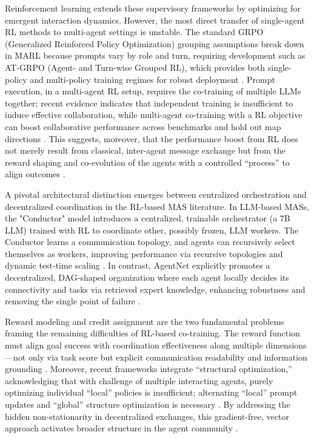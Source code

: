 \documentclass[11pt,a4paper]{article}
\begin{document}
Reinforcement learning extends these supervisory frameworks by optimizing for emergent interaction dynamics. However, the most direct transfer of single-agent RL methods to multi-agent settings is unstable. The standard GRPO (Generalized Reinforced Policy Optimization) grouping assumptions break down in MARL because prompts vary by role and turn, requiring development such as AT-GRPO (Agent- and Turn-wise Grouped RL), which  provides both single-policy and multi-policy training regimes for robust deployment \cite{arxiv:2510.11062v5}. Prompt execution, in a multi-agent RL setup, requires the co-training of multiple LLMs together; recent evidence indicates that independent training is insufficient to induce effective collaboration, while multi-agent co-training with a RL objective can boost collaborative performance across benchmarks and hold out map directions \cite{arxiv:2502.18439v2}. This suggests, moreover, that the performance boost from RL does not merely result from classical, inter-agent message exchange but from the reward shaping and co-evolution of the agents with a controlled ``process'' to align outcomes \cite{arxiv:2501.06322v1}.

A pivotal architectural distinction emerges between centralized orchestration and decentralized coordination in the RL-based MAS literature. In LLM-based MASs, the "Conductor" model introduces a centralized, trainable orchestrator (a 7B LLM) trained with RL to coordinate other, possibly frozen, LLM workers. The Conductor learns a communication topology, and agents can recursively select themselves as workers, improving performance via recursive topologies and dynamic test-time scaling \cite{arxiv:2512.04388v5}. In contrast, AgentNet explicitly promotes a decentralized, DAG-shaped organization where each agent locally decides its connectivity and tasks via retrieved expert knowledge, enhancing robustness and removing the single point of failure \cite{arxiv:2504.00587v2}.

Reward modeling and credit assignment are the two fundamental problems framing the remaining difficulties of RL-based co-training. The reward function must align goal success with coordination effectiveness along multiple dimensions---not only via task score but explicit communication readability and information grounding \cite{arxiv:2501.06322v1}. Moreover, recent frameworks integrate ``structural optimization,'' acknowledging that with challenge of multiple interacting agents, purely optimizing individual ``local'' policies is insufficient; alternating ``local'' prompt updates and ``global'' structure optimization is necessary \cite{arxiv:2502.02533v2}. By addressing the hidden non-stationarity in decentralized exchanges, this gradient-free, vector approach activates broader structure in the agent community \cite{arxiv:2502.02533v2}.
\end{document}
